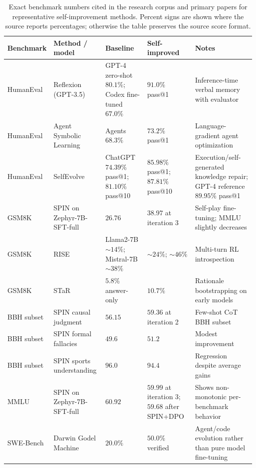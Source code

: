 \begin{table}[t]
\centering
{\TableTight
\begin{tabularx}{\textwidth}{@{}L{0.12\textwidth}L{0.20\textwidth}L{0.18\textwidth}L{0.18\textwidth}Y@{}}
\toprule
\textbf{Benchmark} & \textbf{Method / model} & \textbf{Baseline} & \textbf{Self-improved} & \textbf{Notes} \\
\midrule
HumanEval & Reflexion (GPT-3.5) & GPT-4 zero-shot $80.1\%$; Codex \cite{chen2021codex} fine-tuned $67.0\%$ & $91.0\%$ pass@1 & Inference-time verbal memory with evaluator \\
HumanEval \cite{humaneval2021} & Agent Symbolic Learning \cite{zhou2024agent} & Agents $68.3\%$ & $73.2\%$ pass@1 & Language-gradient agent optimization \\
HumanEval \cite{humaneval2021} & SelfEvolve \cite{jiang2023selfevolve} & ChatGPT $74.39\%$ pass@1; $81.10\%$ pass@10 & $85.98\%$ pass@1; $87.81\%$ pass@10 & Execution/self-generated knowledge repair; GPT-4 reference $89.95\%$ pass@1 \\
GSM8K & SPIN on Zephyr-7B-SFT-full & $26.76$ & $38.97$ at iteration 3 & Self-play fine-tuning; MMLU slightly decreases \\
GSM8K & RISE & Llama2-7B $\sim14\%$; Mistral-7B $\sim38\%$ & $\sim24\%$; $\sim46\%$ & Multi-turn RL introspection \\
GSM8K & STaR & $5.8\%$ answer-only & $10.7\%$ & Rationale bootstrapping on early models \\
BBH subset & SPIN causal judgment & $56.15$ & $59.36$ at iteration 2 & Few-shot CoT BBH subset \\
BBH subset & SPIN formal fallacies & $49.6$ & $51.2$ & Modest improvement \\
BBH subset & SPIN sports understanding & $96.0$ & $94.4$ & Regression despite average gains \\
MMLU & SPIN on Zephyr-7B-SFT-full & $60.92$ & $59.99$ at iteration 3; $59.68$ after SPIN+DPO & Shows non-monotonic per-benchmark behavior \\
SWE-Bench \cite{swebench2023} & Darwin Godel Machine \cite{zhang2025darwin} & $20.0\%$ & $50.0\%$ verified & Agent/code evolution rather than pure model fine-tuning \\
\bottomrule
\end{tabularx}}
\caption{Exact benchmark numbers cited in the research corpus and primary papers for representative self-improvement methods. Percent signs are shown where the source reports percentages; otherwise the table preserves the source score format.}
\label{tab:benchmark-data}
\end{table}

